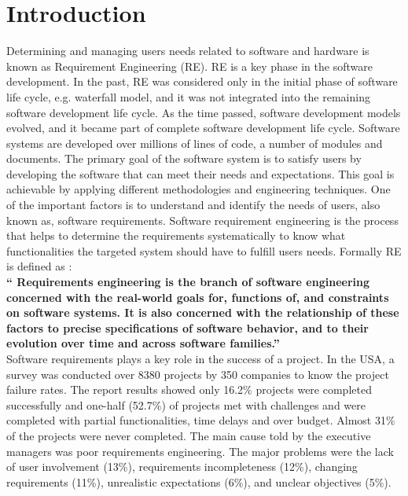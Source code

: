 \section{Introduction}

Determining and managing users needs related to software and hardware is known as
Requirement Engineering (RE). RE is a key phase in the software development. In the past,
RE was considered only in the initial phase of software life cycle, e.g. waterfall model, and it was
not integrated into the remaining software development life cycle. As the time passed, software
development models evolved, and it became part of complete software development life
cycle.
Software systems are developed over millions of lines of code, a number of modules and
documents. The primary goal of the software system is to satisfy users by developing the
software that can meet their needs and expectations. This goal is achievable by applying
different methodologies and engineering techniques. One of the important factors is to understand and
identify the needs of users, also known as, software requirements. Software requirement
engineering is the process that helps to determine the requirements systematically to know
what functionalities the targeted system should have to fulfill users needs. Formally RE is
defined as \cite {Zave:1997} :\\
\textbf{ `` Requirements engineering is the branch of software engineering concerned with the real-world
goals for, functions of, and constraints on software systems. It is also concerned with the
relationship of these factors to precise specifications of software behavior, and to their evolution
over time and across software families.''} \\

	Software requirements plays a key role in the success of a project. In the USA, a survey was
conducted over 8380 projects by 350 companies to know the project failure rates. The report
 \cite{StandishReport} results showed only 16.2\% projects were completed successfully and one-half (52.7\%)
of projects met with challenges and were completed with partial functionalities, time delays and
over budget. Almost 31\% of the projects were never completed. The main cause told by the
executive managers was poor requirements engineering. The major problems were the lack of user
involvement (13\%), requirements incompleteness (12\%), changing requirements (11\%),
unrealistic expectations (6\%), and unclear objectives (5\%). \\

